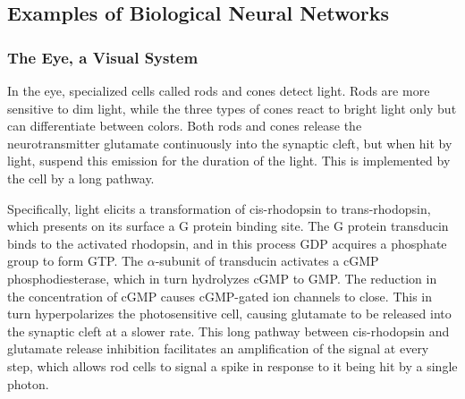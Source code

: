 \subsection{Examples of Biological Neural Networks}

\subsubsection{The Eye, a Visual System}

In the eye, specialized cells called rods and cones detect light\cite{Biochemistry2002,Kolb2003}.
Rods are more sensitive to dim light, while the three types of cones
react to bright light only but can differentiate between colors. Both
rods and cones release the neurotransmitter glutamate continuously
into the synaptic cleft, but when hit by light, suspend this emission
for the duration of the light. This is implemented by the cell by
a long pathway.

Specifically, light elicits a transformation of cis-rhodopsin to trans-rhodopsin,
which presents on its surface a G protein binding site. The G protein
transducin binds to the activated rhodopsin, and in this process GDP
acquires a phosphate group to form GTP. The $\alpha$-subunit of transducin
activates a cGMP phosphodiesterase, which in turn hydrolyzes cGMP
to GMP. The reduction in the concentration of cGMP causes cGMP-gated
ion channels to close. This in turn hyperpolarizes the photosensitive
cell, causing glutamate to be released into the synaptic cleft at
a slower rate. This long pathway between cis-rhodopsin and glutamate
release inhibition facilitates an amplification of the signal at every
step, which allows rod cells to signal a spike in response to it being
hit by a single photon.

